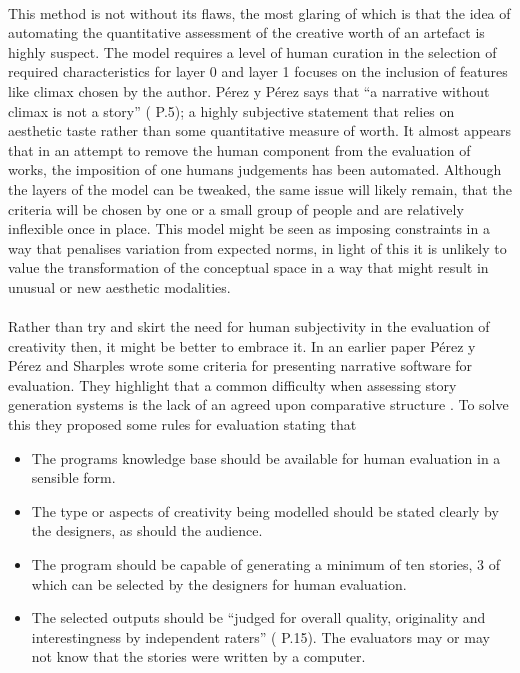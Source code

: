 \documentclass[letterpaper]{article}
\begin{document}
\\This method is not without its flaws, the most glaring of which is that the idea of automating the quantitative assessment of the creative worth of an artefact is highly suspect. The model requires a level of human curation in the selection of required characteristics for layer 0 and layer 1 focuses on the inclusion of features like climax chosen by the author. P\'erez y P\'erez says that \enquote{a narrative without climax is not a story} (\citeauthor{y2014three} \citeyear{y2014three} P.5); a highly subjective statement that relies on aesthetic taste rather than some quantitative measure of worth. It almost appears that in an attempt to remove the human component from the evaluation of works, the imposition of one humans judgements has been automated. Although the layers of the model can be tweaked, the same issue will likely remain, that the criteria will be chosen by one or a small group of people and are relatively inflexible once in place. This model might be seen as imposing constraints in a way that penalises variation from expected norms, in light of this it is unlikely to value the transformation of the conceptual space in a way that might result in unusual or new aesthetic modalities.\\
\\Rather than try and skirt the need for human subjectivity in the evaluation of creativity then, it might be better to embrace it. In an earlier paper P\'erez y P\'erez and Sharples wrote some criteria for presenting narrative software for evaluation. They highlight that a common difficulty when assessing story generation systems is the lack of an agreed upon comparative structure \cite{PEREZYPEREZ200415}. To solve this they proposed some rules for evaluation stating that
\begin{itemize}
\item The programs knowledge base should be available for human evaluation in a sensible form.
\item The type or aspects of creativity being modelled should be stated clearly by the designers, as should the audience.
\item The program should be capable of generating a minimum of ten stories, 3 of which can be selected by the designers for human evaluation.
\item The selected outputs should be \enquote{judged for overall quality, originality and interestingness by independent raters} (\citeauthor{PEREZYPEREZ200415} \citeyear{PEREZYPEREZ200415} P.15). The evaluators may or may not know that the stories were written by a computer.
\end{itemize}
\end{document}
